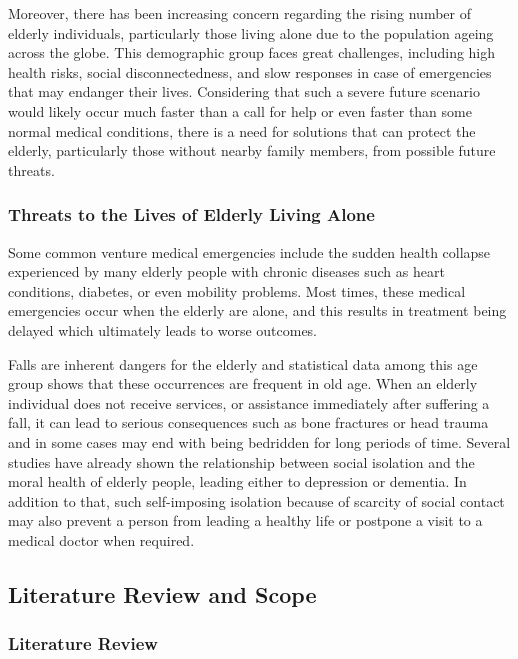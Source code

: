 \documentclass[a4paper, 12pt]{article}
\begin{document}
Moreover, there has been increasing concern regarding the rising number of elderly individuals, particularly those living alone due to the population ageing across the globe. This demographic group faces great challenges, including high health risks, social disconnectedness, and slow responses in case of emergencies that may endanger their lives. Considering that such a severe future scenario would likely occur much faster than a call for help or even faster than some normal medical conditions, there is a need for solutions that can protect the elderly, particularly those without nearby family members, from possible future threats.

\subsubsection{\textbf{\large Threats to the Lives of Elderly Living Alone}}

Some common venture medical emergencies include the sudden health collapse experienced by many elderly people with chronic diseases such as heart conditions, diabetes, or even mobility problems. Most times, these medical emergencies occur when the elderly are alone, and this results in treatment being delayed which ultimately leads to worse outcomes.

Falls are inherent dangers for the elderly and statistical data among this age group shows that these occurrences are frequent in old age. When an elderly individual does not receive services, or assistance immediately after suffering a fall, it can lead to serious consequences such as bone fractures or head trauma and in some cases may end with being bedridden for long periods of time.
Several studies have already shown the relationship between social isolation and the moral health of elderly people, leading either to depression or dementia. In addition to that, such self-imposing isolation because of scarcity of social contact may also prevent a person from leading a healthy life or postpone a visit to a medical doctor when required.

\subsection{\textbf{\Large Literature Review and Scope}}
\subsubsection{\textbf{\large Literature Review}}
\end{document}
